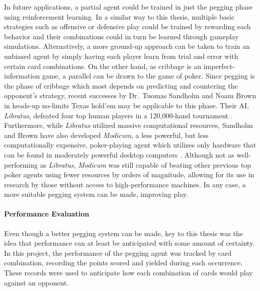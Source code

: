 In future applications,
a partial agent could be trained in just the pegging phase
using reinforcement learning.
%
In a similar way to this thesis,
multiple basic strategies such as offensive or defensive play
could be trained by rewarding each behavior and their combinations
could in turn be learned through gameplay simulations.
%
Alternatively,
a more ground-up approach can be taken to train an unbiased agent by simply
having each player learn from trial and error with certain card combinations.
%
%
On the other hand,
as cribbage is an imperfect-information game,
a parallel can be drawn to the game of poker.
%
Since pegging is the phase of cribbage
which most depends on predicting and countering the opponent's strategy,
recent successes by Dr.\ Tuomas Sandholm and Noam Brown
in heads-up no-limits Texas hold'em may be applicable to
this phase.
%
Their AI, \textit{Libratus},
defeated four top human players
in a 120,000-hand tournament
\cite{sandholm_poker}.
%
Furthermore, while \textit{Libratus} utilized massive computational resources,
Sandholm and Brown have also developed \textit{Modicum},
a less powerful, but less computationally expensive, poker-playing agent
which utilizes only hardware that can be found in moderately powerful desktop computers
\cite{sandholm_poker_improved}.
%
Although not as well-performing as \textit{Libratus},
\textit{Modicum} was still capable of beating other previous top poker agents
using fewer resources by orders of magnitude,
allowing for its use in research by those without access to high-performance machines.
%
In any case,
a more suitable pegging system can be made,
improving play.

\paragraph*{Performance Evaluation}

Even though a better pegging system can be made,
key to this thesis was the idea that performance can at least be
anticipated with some amount of certainty.
%
In this project,
the performance of the pegging agent was tracked by card combination,
recording the points scored and yielded during each occurrence.
%
These records were used to anticipate how each combination of cards would
play against an opponent.

